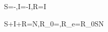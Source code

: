 \dot S=-\beta{},\qquad\dot I=\beta{}-\gamma I,\qquad\dot R=\gamma I

S+I+R=N,\qquad R_0=\frac\beta\gamma,\quad R_e=R_0\frac SN
